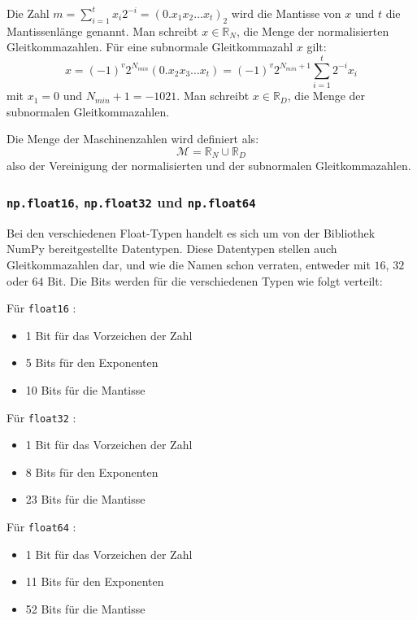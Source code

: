 \documentclass{scrartcl}
\begin{document}
Die Zahl \( m = \sum_{i=1}^{t}x_i 2^{-i} = (0.x_1x_2\ldots x_t)_2 \) wird die
Mantisse von \( x \) und \( t \) die Mantissenlänge genannt.
Man schreibt \( x \in \mathbb{R}_N \), die Menge der normalisierten
Gleitkommazahlen.
Für eine subnormale Gleitkommazahl \( x \) gilt: \[ x = (-1)^v 2^{N_{min}}
    (0.x_2 x_3 \ldots x_t) = (-1)^v 2^{N_{min}+1} \sum_{i=1}^{t} 2^{-i} x_i \] mit
\( x_1 = 0 \) und \( N_{min} + 1 = -1021 \).
Man schreibt \( x \in \mathbb{R}_D \), die Menge der subnormalen
Gleitkommazahlen.

Die Menge der Maschinenzahlen wird definiert als: \[ \mathcal{M} = \mathbb{R}_N
    \cup \mathbb{R}_D \] also der Vereinigung der normalisierten und der
subnormalen Gleitkommazahlen.

\subsubsection{\texttt{np.float16}, \texttt{np.float32} und \texttt{np.float64}}
Bei den verschiedenen Float-Typen handelt es sich um von der Bibliothek NumPy
bereitgestellte Datentypen.
Diese Datentypen stellen auch Gleitkommazahlen dar, und wie die Namen schon
verraten, entweder mit \( 16 \), \( 32 \) oder \( 64 \) Bit.
Die Bits werden für die verschiedenen Typen wie folgt verteilt:

Für \texttt{float16} \cite{half-precision_floating-point_format}:
\begin{itemize}
    \item 1 Bit für das Vorzeichen der Zahl %
    \item 5 Bits für den Exponenten
    \item 10 Bits für die Mantisse
\end{itemize}

Für \texttt{float32} \cite{single-precision_floating-point_format}:
\begin{itemize}
    \item 1 Bit für das Vorzeichen der Zahl %
    \item 8 Bits für den Exponenten
    \item 23 Bits für die Mantisse
\end{itemize}

Für \texttt{float64} \cite{double-precision_floating-point_format}:
\begin{itemize}
    \item 1 Bit für das Vorzeichen der Zahl
    \item 11 Bits für den Exponenten
    \item 52 Bits für die Mantisse
\end{itemize}
\end{document}
